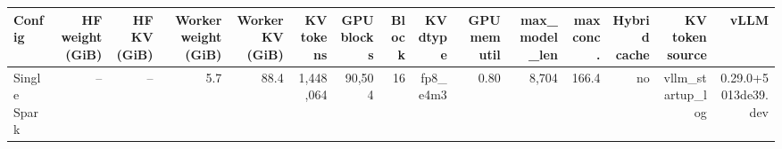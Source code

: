 \begin{tabular}{l r r r r r r r r r r r r r r }
\toprule
Config & HF weight (GiB) & HF KV (GiB) & Worker weight (GiB) & Worker KV (GiB) & KV tokens & GPU blocks & Block & KV dtype & GPU mem util & max\_model\_len & max conc. & Hybrid cache & KV token source & vLLM \\
\midrule
Single Spark & -- & -- & 5.7 & 88.4 & 1,448,064 & 90,504 & 16 & fp8\_e4m3 & 0.80 & 8,704 & 166.4 & no & vllm\_startup\_log & 0.29.0+5013de39.dev \\
\bottomrule
\end{tabular}
